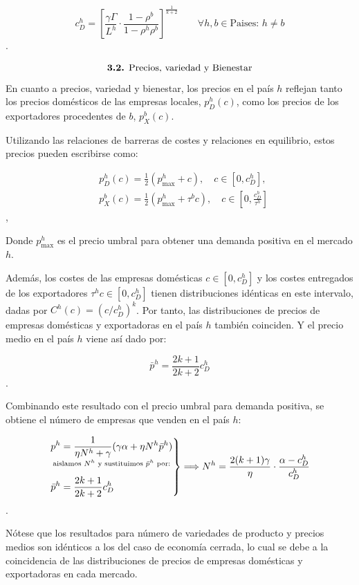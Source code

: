 \documentclass[10pt,a4paper]{article}
\begin{document}
$$c_D^h = \left[ \frac{\gamma\Gamma}{L^h} \cdot \frac{1 - \rho^b}{1 - \rho^h \rho^b} \right]^{\frac{1}{k+2}}\qquad \forall h,b\in\text{Paises}:\,h\neq b$$.

$$\text{\textbf{3.2.} Precios, variedad y Bienestar}$$
En cuanto a precios, variedad y bienestar, los precios en el país $h$ reflejan tanto los precios domésticos de las empresas locales, $p_D^h(c)$, como los precios de los exportadores procedentes de $b$, $p_X^b(c)$. 

Utilizando las relaciones de barreras de costes y relaciones en equilibrio, estos precios pueden escribirse como:

$$\begin{aligned}
    &p_D^h(c) = \frac{1}{2}(p_{\max}^h + c), \quad c \in [0, c_D^h],\\[1em]
    &p_X^b(c) = \frac{1}{2}(p_{\max}^h + \tau^b c), \quad c \in \left[0, \frac{c_D^h}{\tau^h}\right]
\end{aligned}$$,

Donde $p_{\max}^h$ es el precio umbral para obtener una demanda positiva en el mercado $h$. 

Además, los costes de las empresas domésticas $c \in [0, c_D^h]$ y los costes entregados de los exportadores $\tau^h c \in [0, c_D^h]$ tienen distribuciones idénticas en este intervalo, dadas por $C^h(c) = (c/c_D^h)^k$. Por tanto, las distribuciones de precios de empresas domésticas y exportadoras en el país $h$ también coinciden. Y el precio medio en el país $h$ viene así dado por:

$$\bar{p}^h = \frac{2k + 1}{2k + 2} c_D^h$$.

Combinando este resultado con el precio umbral para demanda positiva, se obtiene el número de empresas que venden en el país $h$:

$$\left.\begin{aligned}
    &\underset{\text{\scriptsize aislamos $N^h$ y sustituimos $\bar p^h$ por:}}{p^h = \frac{1}{\eta N^h + \gamma} (\gamma \alpha + \eta N^h \bar{p}^h)}\\[0.5em]
    &\bar{p}^h = \frac{2k + 1}{2k + 2} c_D^h
\end{aligned}\right\}\Longrightarrow N^h = \frac{2(k + 1)\gamma}{\eta} \cdot \frac{\alpha - c_D^h}{c_D^h}$$.

Nótese que los resultados para número de variedades de producto y precios medios son idénticos a los del caso de economía cerrada, lo cual se debe a la coincidencia de las distribuciones de precios de empresas domésticas y exportadoras en cada mercado. 
\end{document}

